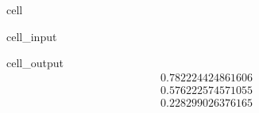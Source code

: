 \documentclass[letterpaper,10pt,english]{jupyterBook}
\begin{document}
\begin{sphinxuseclass}{cell}\begin{sphinxVerbatimInput}

\begin{sphinxuseclass}{cell_input}
\begin{sphinxVerbatim}[commandchars=\\\{\}]
\end{sphinxVerbatim}

\end{sphinxuseclass}\end{sphinxVerbatimInput}
\begin{sphinxVerbatimOutput}

\begin{sphinxuseclass}{cell_output}\begin{equation*}
\begin{split}0.782224424861606\end{split}
\end{equation*}\begin{equation*}
\begin{split}0.576222574571055\end{split}
\end{equation*}\begin{equation*}
\begin{split}0.228299026376165\end{split}
\end{equation*}
\end{sphinxuseclass}\end{sphinxVerbatimOutput}

\end{sphinxuseclass}
\end{document}
